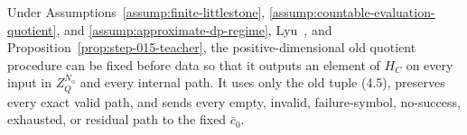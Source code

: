 \begin{proposition}\label{prop:step-015-total}
Under Assumptions~\ref{assump:finite-littlestone},
\ref{assump:countable-evaluation-quotient}, and
\ref{assump:approximate-dp-regime},
Lyu~\citep[Claim~4.1, Definitions~4.2--4.3, Lemmas~4.1 and~4.3,
and Corollary~4.1]{lyu2025},
and Proposition~\ref{prop:step-015-teacher}, the positive-dimensional old
quotient procedure can be fixed before data so that it outputs an element
of \(H_C\) on every input in \(Z_Q^{N_{\mathrm o}}\) and every internal
path. It uses only the old tuple (4.5), preserves every exact valid
path, and sends every empty, invalid, failure-symbol, no-success, exhausted,
or residual path to the fixed \(\bar c_0\).


\end{proposition}


